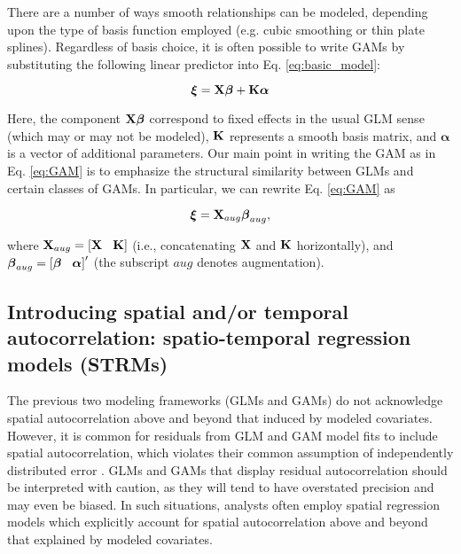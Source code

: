 \documentclass[12pt,fleqn]{article}
\begin{document}
\begin{flushleft}
\hspace{.5in}There are a number of ways smooth relationships can be modeled, depending upon the type of basis function employed (e.g. cubic smoothing or thin plate splines). Regardless of basis choice, it is often possible to write GAMs by substituting the following linear predictor into Eq. \ref{eq:basic_model}:
\begin{linenomath*}
\begin{equation}
  \label{eq:GAM}
  \boldsymbol{\xi}={\bf X} \boldsymbol{\beta} + {\bf K} \boldsymbol{\alpha} \end{equation}
\end{linenomath*}
Here, the component ${\bf X} \boldsymbol{\beta}$ correspond to fixed effects in the usual GLM sense (which may or may not be modeled), ${\bf K}$ represents a smooth basis matrix, and $\boldsymbol{\alpha}$ is a vector of additional parameters.  Our main point in writing the GAM as in Eq. \ref{eq:GAM} is to emphasize the structural similarity between GLMs and certain classes
of GAMs.  In particular,
we can rewrite Eq. \ref{eq:GAM} as
\begin{linenomath*}
  \begin{equation}
    \label{eq:GAM-aug}
    \boldsymbol{\xi}={\bf X}_{aug} \boldsymbol{\beta}_{aug},
  \end{equation}
\end{linenomath*}
where ${\bf X}_{aug} = \left[ {\bf X} \hspace{3mm} {\bf K} \right]$ (i.e., concatenating ${\bf X}$ and ${\bf K}$ horizontally), and $\boldsymbol{\beta}_{aug}=\left[  \boldsymbol{\beta} \hspace{3mm} \boldsymbol{\alpha} \right] ^\prime$ (the subscript $aug$ denotes augmentation).

\subsection{Introducing spatial and/or temporal autocorrelation: spatio-temporal regression models (STRMs)}

The previous two modeling frameworks (GLMs and GAMs) do not acknowledge spatial autocorrelation above and beyond that induced
by modeled covariates.  However, it is common for residuals from GLM and GAM model fits to include spatial autocorrelation, which violates their common assumption of independently distributed error \citep{Legendre1993,LichsteinEtAl2002}.  GLMs and GAMs that display residual autocorrelation should be interpreted with caution, as they will tend to have overstated precision and may even be biased.  In such situations, analysts often employ spatial regression models which explicitly account for spatial autocorrelation above and beyond that explained by modeled covariates.


\end{flushleft}
\end{document}
